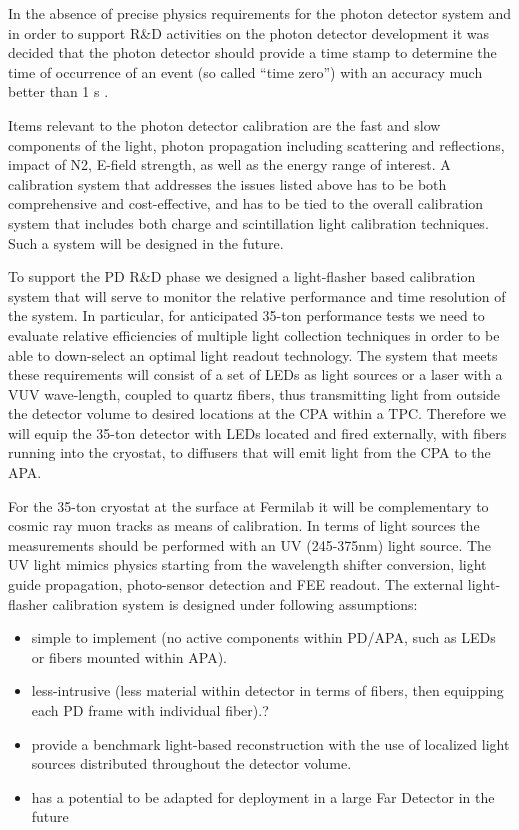 In the absence of precise physics requirements
for the photon detector system and in order to support R\&D activities
on the photon detector development it was decided that the photon
detector should provide a time stamp to determine the time of
occurrence of an event (so called ``time zero'') with an accuracy much
better than 1 s .  

Items relevant to the photon detector calibration
are the fast and slow components of the light, photon propagation
including scattering and reflections, impact of N2, E-field strength,
as well as the energy range of interest. A calibration system that
addresses the issues listed above has to be both comprehensive and
cost-effective, and has to be tied to the overall calibration system
that includes both charge and scintillation light calibration
techniques. Such a system will be designed in the future.  

To support
the PD R\&D phase we designed a light-flasher based calibration system
that will serve to monitor the relative performance and time
resolution of the system. In particular, for anticipated 35-ton
performance tests we need to evaluate relative efficiencies of
multiple light collection techniques in order to be able to
down-select an optimal light readout technology. The system that meets
these requirements will consist of a set of LEDs as light sources or a
laser with a VUV wave-length, coupled to quartz fibers, thus
transmitting light from outside the detector volume to desired
locations at the CPA within a TPC. Therefore we will equip the 35-ton
detector with LEDs located and fired externally, with fibers running
into the cryostat, to diffusers that will emit light from the CPA to
the APA. 

For the 35-ton cryostat at the surface at Fermilab it will be
complementary to cosmic ray muon tracks as means of calibration. In
terms of light sources the measurements should be performed with an UV
(245-375nm) light source. The UV light mimics physics starting from
the wavelength shifter conversion, light guide propagation,
photo-sensor detection and FEE readout.  The external light-flasher
calibration system is designed under following assumptions:
\begin{itemize}
\item simple to implement (no active components within PD/APA, such as
  LEDs or fibers mounted within APA).
\item less-intrusive (less material within detector in terms of
  fibers, then equipping each PD frame with individual fiber).?\item
  provide a benchmark light-based reconstruction with the use of
  localized light sources distributed throughout the detector volume.
\item has a potential to be adapted for deployment in a large Far
  Detector in the future
\end{itemize}

